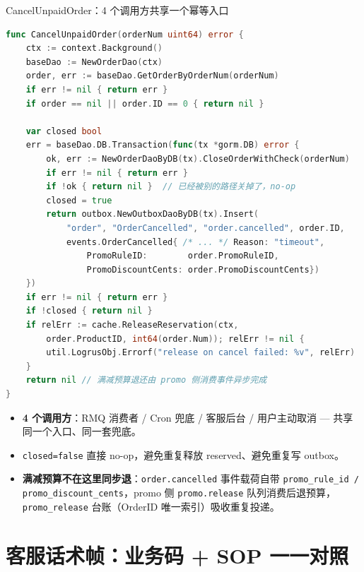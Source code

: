 \documentclass[aspectratio=169,11pt]{beamer}
\begin{document}
\begin{frame}{CancelUnpaidOrder：4 个调用方共享一个幂等入口}
\begin{lstlisting}[language=Go,firstnumber=19,
  caption={internal/order/cancel.go:19--67 共享入口（节选）},captionpos=b]
func CancelUnpaidOrder(orderNum uint64) error {
    ctx := context.Background()
    baseDao := NewOrderDao(ctx)
    order, err := baseDao.GetOrderByOrderNum(orderNum)
    if err != nil { return err }
    if order == nil || order.ID == 0 { return nil }

    var closed bool
    err = baseDao.DB.Transaction(func(tx *gorm.DB) error {
        ok, err := NewOrderDaoByDB(tx).CloseOrderWithCheck(orderNum)
        if err != nil { return err }
        if !ok { return nil }  // 已经被别的路径关掉了，no-op
        closed = true
        return outbox.NewOutboxDaoByDB(tx).Insert(
            "order", "OrderCancelled", "order.cancelled", order.ID,
            events.OrderCancelled{ /* ... */ Reason: "timeout",
                PromoRuleID:        order.PromoRuleID,
                PromoDiscountCents: order.PromoDiscountCents})
    })
    if err != nil { return err }
    if !closed { return nil }
    if relErr := cache.ReleaseReservation(ctx,
        order.ProductID, int64(order.Num)); relErr != nil {
        util.LogrusObj.Errorf("release on cancel failed: %v", relErr)
    }
    return nil // 满减预算退还由 promo 侧消费事件异步完成
}
\end{lstlisting}
\begin{itemize}
  \item \textbf{4 个调用方}：RMQ 消费者 / Cron 兜底 / 客服后台 / 用户主动取消 — 共享同一个入口、同一套兜底。
  \item \texttt{closed=false} 直接 no-op，避免重复释放 reserved、避免重复写 outbox。
  \item \textbf{满减预算不在这里同步退}：\texttt{order.cancelled} 事件载荷自带 \texttt{promo\_rule\_id / promo\_discount\_cents}，promo 侧 \texttt{promo.release} 队列消费后退预算，\texttt{promo\_release} 台账（OrderID 唯一索引）吸收重复投递。
\end{itemize}
\end{frame}

\section{客服话术帧：业务码 + SOP 一一对照}
\end{document}
